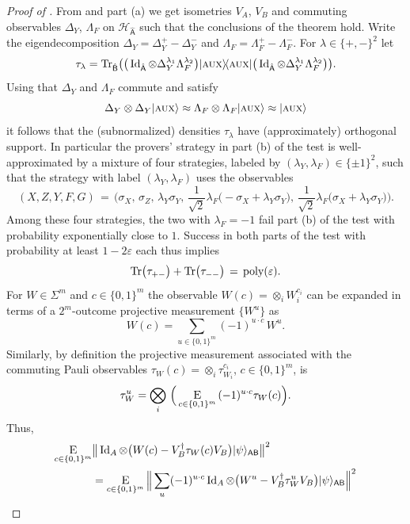 \documentclass{toc}
\newcommand{\ket}[1]{|#1\rangle}
\newcommand{\bra}[1]{\langle#1|}
\newcommand{\proj}[1]{\ket{#1}\!\bra{#1}}
\newcommand{\Tr}{\mbox{\rm Tr}}
\newcommand{\Id}{\ensuremath{\mathop{\rm Id}\nolimits}}
\newcommand{\Es}[1]{\ensuremath{\mathop{\textsc{E}}}_{#1}} %
\DeclareMathOperator{\poly}{poly}
\newcommand{\reg}[1]{{\textsf{#1}}}
\newcommand{\mH}{\mathcal{H}}
\newcommand{\eps}{\varepsilon}
\newcommand{\aux}{\textsc {aux}}
\newcommand{\phase}{\Lambda}
\begin{document}
\begin{proof}[Proof of ]
From  and part (a) we get isometries $V_A$, $V_B$ and commuting observables $\Delta_Y$, $\phase_F$ on ${\mH}_{\hat{\reg{A}}}$ such that the conclusions of the theorem hold. Write the eigendecomposition $\Delta_Y = \Delta_Y^{+}-\Delta_Y^{-}$ and $\phase_F = \phase_F^{+}-\phase_F^{-}$. For $\lambda \in \{+,-\}^2$ let
$$\tau_{\lambda} = \Tr_{\hat{\reg{B}}}\big( \big(\Id_{\hat{\reg{A}}}\otimes \Delta_Y^{\lambda_1}\phase_F^{\lambda_2} \big)\proj{\aux}\big(\Id_{\hat{\reg{A}}}\otimes \Delta_Y^{\lambda_1}\phase_F^{\lambda_2}\big)\big).$$ 
Using that $\Delta_Y$ and $\phase_F$ commute and satisfy 
$$\Delta_Y \otimes \Delta_Y \ket{\aux} \approx \phase_F\otimes \phase_F \ket{\aux} \approx \ket{\aux}$$
 it follows that the (subnormalized) densities $\tau_{\lambda}$ have (approximately) orthogonal support. In particular the provers' strategy in part (b) of the test is well-approximated by a mixture of four strategies, labeled by $(\lambda_Y,\lambda_F)\in\{\pm 1\}^2$, such that the strategy with label $(\lambda_Y,\lambda_F)$ uses the observables 
$$(X,Z,Y,F,G)\,=\,\Big(\sigma_X,\,\sigma_Z,\,\lambda_Y\sigma_Y,\,\frac{1}{\sqrt{2}}\lambda_F\big(-\sigma_X + \lambda_Y\sigma_Y\big),\,\frac{1}{\sqrt{2}}\lambda_F\big(\sigma_X + \lambda_Y\sigma_Y\big)\Big).$$ 
Among these four strategies, the two with $\lambda_F=-1$ fail part (b) of the test with probability exponentially close to $1$. Success in both parts of the test with probability at least $1-2\eps$ each thus implies
\begin{equation}\label{eq:tau-bound}
\Tr\big(\tau_{+-}\big)+\Tr\big(\tau_{--}\big) \,=\, \poly(\eps).
\end{equation} 
For $W\in \Sigma^{m}$ and $c\in \{0,1\}^m$ the observable $W(c) = \otimes_i W_{i}^{c_i}$ can be expanded in terms of a $2^m$-outcome projective measurement $\{W^{u}\}$ as 
$$W(c) = \sum_{u\in \{0,1\}^m}  (-1)^{u\cdot c} \,W^{u}.$$
Similarly, by definition the projective measurement associated with the commuting Pauli observables $\tau_W(c) = \otimes_i \tau_{W_{i}}^{c_i}$, $c\in\{0,1\}^m$, is 
$$\tau_W^{u} = \bigotimes_i \,\Big(\Es{c\in \{0,1\}^m} \,(-1)^{u \cdot c} \tau_W(c)\Big).$$ 
Thus,
\begin{align}
\Es{c\in\{0,1\}^m} & \big\| \Id_A \otimes \big(  W(c) - V_B^\dagger \tau_{W}(c) V_B\big)   \ket{\psi}_{\reg{AB}} \big\|^2\notag\\
&= \Es{c\in\{0,1\}^m}\Big\| \sum_{u} (-1)^{u\cdot c} \Id_A \otimes \big(  W^{u} - V_B^\dagger\tau_{W}^{u} V_B\big)   \ket{\psi}_{\reg{AB}} \Big\|^2    \notag\\

\end{align}
\end{proof}
\end{document}
